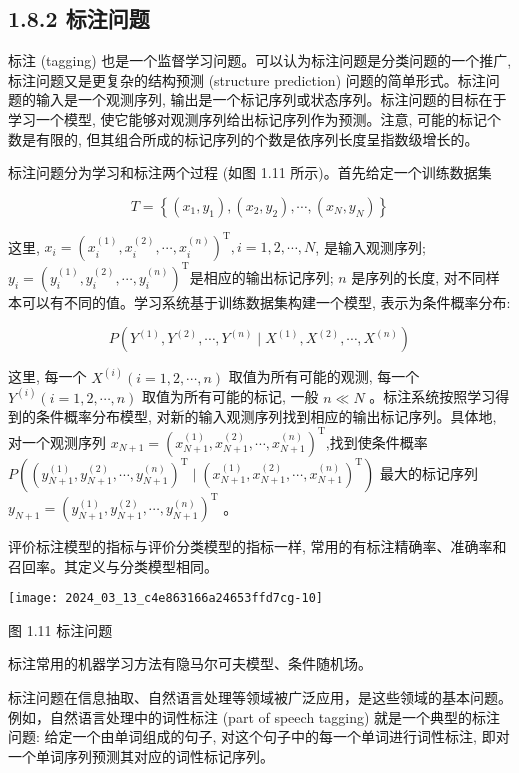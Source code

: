 \documentclass[10pt]{article}
\begin{document}
\subsection*{1.8.2 标注问题}
标注 (tagging) 也是一个监督学习问题。可以认为标注问题是分类问题的一个推广, 标注问题又是更复杂的结构预测 (structure prediction) 问题的简单形式。标注问题的输入是一个观测序列, 输出是一个标记序列或状态序列。标注问题的目标在于学习一个模型, 使它能够对观测序列给出标记序列作为预测。注意, 可能的标记个数是有限的, 但其组合所成的标记序列的个数是依序列长度呈指数级增长的。

标注问题分为学习和标注两个过程 (如图 1.11 所示)。首先给定一个训练数据集

$$
T=\left\{\left(x_{1}, y_{1}\right),\left(x_{2}, y_{2}\right), \cdots,\left(x_{N}, y_{N}\right)\right\}
$$

这里, $x_{i}=\left(x_{i}^{(1)}, x_{i}^{(2)}, \cdots, x_{i}^{(n)}\right)^{\mathrm{T}}, i=1,2, \cdots, N$, 是输入观测序列; $y_{i}=\left(y_{i}^{(1)}, y_{i}^{(2)}, \cdots, y_{i}^{(n)}\right)^{\mathrm{T}}$是相应的输出标记序列; $n$ 是序列的长度, 对不同样本可以有不同的值。学习系统基于训练数据集构建一个模型, 表示为条件概率分布:

$$
P\left(Y^{(1)}, Y^{(2)}, \cdots, Y^{(n)} \mid X^{(1)}, X^{(2)}, \cdots, X^{(n)}\right)
$$

这里, 每一个 $X^{(i)}(i=1,2, \cdots, n)$ 取值为所有可能的观测, 每一个 $Y^{(i)}(i=1,2, \cdots, n)$ 取值为所有可能的标记, 一般 $n \ll N$ 。标注系统按照学习得到的条件概率分布模型, 对新的输入观测序列找到相应的输出标记序列。具体地, 对一个观测序列 $x_{N+1}=\left(x_{N+1}^{(1)}, x_{N+1}^{(2)}, \cdots, x_{N+1}^{(n)}\right)^{\mathrm{T}}$,找到使条件概率 $P\left(\left(y_{N+1}^{(1)}, y_{N+1}^{(2)}, \cdots, y_{N+1}^{(n)}\right)^{\mathrm{T}} \mid\left(x_{N+1}^{(1)}, x_{N+1}^{(2)}, \cdots, x_{N+1}^{(n)}\right)^{\mathrm{T}}\right)$ 最大的标记序列 $y_{N+1}=\left(y_{N+1}^{(1)}, y_{N+1}^{(2)}, \cdots, y_{N+1}^{(n)}\right)^{\mathrm{T}}$ 。

评价标注模型的指标与评价分类模型的指标一样, 常用的有标注精确率、准确率和召回率。其定义与分类模型相同。

\begin{center}
\texttt{[image: 2024\_03\_13\_c4e863166a24653ffd7cg-10]}
\end{center}

图 1.11 标注问题

标注常用的机器学习方法有隐马尔可夫模型、条件随机场。

标注问题在信息抽取、自然语言处理等领域被广泛应用，是这些领域的基本问题。例如，自然语言处理中的词性标注 (part of speech tagging) 就是一个典型的标注问题: 给定一个由单词组成的句子, 对这个句子中的每一个单词进行词性标注, 即对一个单词序列预测其对应的词性标记序列。
\end{document}
